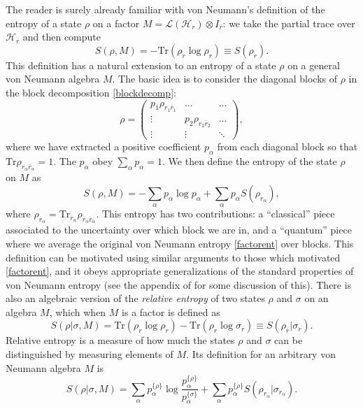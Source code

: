 \documentclass[toc]{PoS}
\newcommand{\be}{\begin{equation}}
\newcommand{\ee}{\end{equation}}
\newcommand{\Tr}{\mathrm{Tr}}
\newcommand{\Ll}{\mathcal{L}}
\newcommand{\Hh}{\mathcal{H}}
\newcommand{\ol}{\overline}
\begin{document}
The reader is surely already familiar with von Neumann's definition of the entropy of a state $\rho$ on a factor $M=\Ll(\Hh_r)\otimes I_{\ol{r}}$: we take the partial trace over $\Hh_{\ol{r}}$ and then compute
\be\label{factorent}
S(\rho,M)=-\Tr \left(\rho_r\log \rho_r\right)\equiv S(\rho_r).
\ee
This definition has a natural extension to an entropy of a state $\rho$ on a general von Neumann algebra $M$.  The basic idea is to consider the diagonal blocks of $\rho$ in the block decomposition \eqref{blockdecomp}:
\be
\rho=\begin{pmatrix}
p_1 \rho_{r_1\ol{r}_1} & \ldots & \ldots\\
\vdots & p_2 \rho_{r_2\ol{r}_2} & \ldots\\
\vdots & \vdots & \ddots
\end{pmatrix},
\ee
where we have extracted a positive coefficient $p_\alpha$ from each diagonal block so that $\Tr\rho_{r_\alpha \ol{r}_\alpha}=1$.  The $p_\alpha$ obey $\sum_\alpha p_\alpha=1$.  We then define the entropy of the state $\rho$ on $M$ as
\be
S(\rho,M)=-\sum_\alpha p_\alpha \log p_\alpha+\sum_\alpha p_\alpha S(\rho_{r_\alpha}),
\ee
where $\rho_{r_\alpha}=\Tr_{\ol{r}_\alpha}\rho_{r_\alpha \ol{r}_\alpha}$.  This entropy has two contributions: a ``classical'' piece associated to the uncertainty over which block we are in, and a ``quantum'' piece where we average the original von Neumann entropy \eqref{factorent} over blocks. This definition can be motivated using similar arguments to those which motivated \eqref{factorent}, and it obeys appropriate generalizations of the standard properties of von Neumann entropy (see the appendix of \cite{Harlow:2016vwg} for some discussion of this).  There is also an algebraic version of the \textit{relative entropy} of two states $\rho$ and $\sigma$ on an algebra $M$, which when $M$ is a factor is defined as
\be
S(\rho|\sigma,M)=\Tr\left(\rho_r\log \rho_r\right)-\Tr \left(\rho_r \log \sigma_r\right)\equiv S(\rho_r|\sigma_r).
\ee
Relative entropy is a measure of how much the states $\rho$ and $\sigma$ can be distinguished by measuring elements of $M$.  Its definition for an arbitrary von Neumann algebra $M$ is 
\be
S(\rho|\sigma,M)=\sum_\alpha p_\alpha^{\{\rho\}}\log \frac{p_\alpha^{\{\rho\}}}{p_\alpha^{\{\sigma\}}}+\sum_\alpha p_\alpha^{\{\rho\}}S\left(\rho_{r_\alpha}|\sigma_{r_\alpha}\right).
\ee
\end{document}
